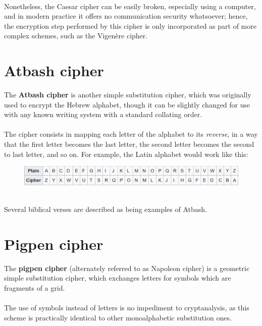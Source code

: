 \documentclass[Lau,binding=0.6cm,oneside]{sapthesis}
\begin{document}
\ \\
Nonetheless, the Caesar cipher can be easily broken, especially using a computer, and in modern practice it offers no communication security whatsoever; hence, the encryption step performed by this cipher is only incorporated as part of more complex schemes, such as the Vigenère cipher.

\section{Atbash cipher}
The \textbf{Atbash cipher} is another simple substitution cipher, which was originally used to encrypt the Hebrew alphabet, though it can be slightly changed for use with any known writing system with a standard collating order.\\\\
The cipher consists in mapping each letter of the alphabet to its \textit{reverse}, in a way that the first letter becomes the last letter, the second letter becomes the second to last letter, and so on. For example, the Latin alphabet would work like this: \\

\begin{figure}[H]
\includegraphics[scale=0.65]{atbash_cipher}
\centering
\caption{}
\centering
\end{figure}

\ \\
Several biblical verses are described as being examples of Atbash\supercite{atbash}.\\

\section{Pigpen cipher}
The \textbf{pigpen cipher} (alternately referred to as Napoleon cipher) is a geometric simple substitution cipher, which exchanges letters for symbols which are fragments of a grid.\\\\
The use of symbols instead of letters is no impediment to cryptanalysis, as this scheme is practically identical to other monoalphabetic substitution ones.\\\\
\end{document}
